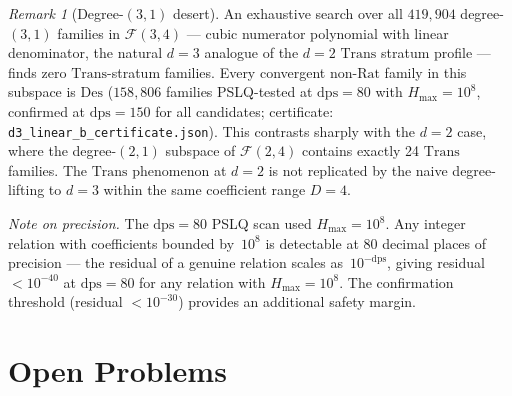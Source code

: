 \documentclass[12pt, reqno]{amsart}
\theoremstyle{definition}
\theoremstyle{remark}
\newtheorem{remark}[theorem]{Remark}
\newcommand{\Rat}{\mathrm{Rat}}
\newcommand{\Trans}{\mathrm{Trans}}
\newcommand{\Des}{\mathrm{Des}}
\begin{document}
\begin{remark}[Degree-$(3,1)$ desert]\label{rem:d3desert}
An exhaustive search over all $419{,}904$ degree-$(3,1)$
families in $\mathcal{F}(3,4)$ --- cubic numerator polynomial with
linear denominator, the natural $d{=}3$ analogue of the
$d{=}2$ $\Trans$ stratum profile --- finds zero $\Trans$-stratum
families. Every convergent non-$\Rat$ family in this
subspace is $\Des$ ($158{,}806$ families PSLQ-tested at
$\mathrm{dps}=80$ with $H_{\max}=10^8$, confirmed at $\mathrm{dps}=150$ for all
candidates; certificate: \texttt{d3\_linear\_b\_certificate.json}).
This contrasts sharply with the $d{=}2$ case, where the
degree-$(2,1)$ subspace of $\mathcal{F}(2,4)$ contains exactly 24
$\Trans$ families. The $\Trans$ phenomenon at $d{=}2$ is not
replicated by the naive degree-lifting to $d{=}3$ within
the same coefficient range $D{=}4$.

\emph{Note on precision.}
The $\mathrm{dps}=80$ PSLQ scan used $H_{\max}=10^8$.
Any integer relation with coefficients bounded by~$10^8$
is detectable at 80 decimal places of precision --- the
residual of a genuine relation scales as~$10^{-\mathrm{dps}}$,
giving residual~$< 10^{-40}$ at $\mathrm{dps}=80$ for any relation
with $H_{\max}=10^8$. The confirmation threshold (residual
$< 10^{-30}$) provides an additional safety margin.
\end{remark}


\section{Open Problems}\label{sec:open}
\end{document}

